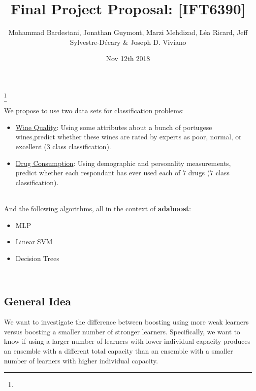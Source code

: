 \documentclass[reqno]{amsart}
\theoremstyle{definition}
\theoremstyle{remark}
\numberwithin{equation}{section}
\begin{document}
\title{Final Project Proposal: [IFT6390]}

\author{Mohammad Bardestani,  Jonathan Guymont, Marzi Mehdizad, L\'ea Ricard, Jeff Sylvestre-D\'ecary \& Joseph D. Viviano}
\address{Universit\'e de Montr\'eal}
\curraddr{}
\thanks{}
\date{Nov 12th 2018}

\maketitle

We propose to use two data sets for classification problems:

\begin{itemize}
    \item \href{https://archive.ics.uci.edu/ml/datasets/Wine+Quality}{Wine Quality}:
          Using some attributes about a bunch of portugese wines,predict whether
          these wines are rated by experts as poor, normal, or excellent (3
          class classification).
    \item \href{https://archive.ics.uci.edu/ml/datasets/Drug+consumption+\%28quantified\%29}{Drug Consumption}:
          Using demographic and personality measurements, predict whether each
          respondant has ever used each of 7 drugs (7 class classification).
\end{itemize} \\

And the following algorithms, all in the context of \textbf{adaboost}:

\begin{itemize}
    \item MLP
    \item Linear SVM
    \item Decision Trees
\end{itemize} \\

\subsection{General Idea}

We want to investigate the difference between boosting using more weak learners
versus boosting a smaller number of stronger learners. Specifically, we want to
know if using a larger number of learners with lower individual capacity
produces an ensemble with a different total capacity than an ensemble with
a smaller number of learners with higher individual capacity.
\end{document}
